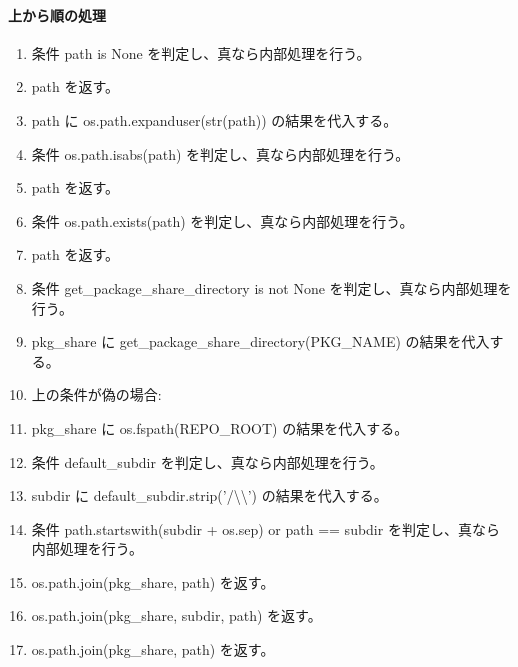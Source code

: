 \documentclass[a4paper,11pt]{article}
\begin{document}
            \paragraph{上から順の処理}
            \begin{enumerate}[leftmargin=1.8em]
            \item 条件 path is None を判定し、真なら内部処理を行う。
\item   path を返す。
\item path に os.path.expanduser(str(path)) の結果を代入する。
\item 条件 os.path.isabs(path) を判定し、真なら内部処理を行う。
\item   path を返す。
\item 条件 os.path.exists(path) を判定し、真なら内部処理を行う。
\item   path を返す。
\item 条件 get\_package\_share\_directory is not None を判定し、真なら内部処理を行う。
\item   pkg\_share に get\_package\_share\_directory(PKG\_NAME) の結果を代入する。
\item   上の条件が偽の場合:
\item   pkg\_share に os.fspath(REPO\_ROOT) の結果を代入する。
\item 条件 default\_subdir を判定し、真なら内部処理を行う。
\item   subdir に default\_subdir.strip('/\textbackslash{}\textbackslash{}') の結果を代入する。
\item   条件 path.startswith(subdir + os.sep) or path == subdir を判定し、真なら内部処理を行う。
\item     os.path.join(pkg\_share, path) を返す。
\item   os.path.join(pkg\_share, subdir, path) を返す。
\item os.path.join(pkg\_share, path) を返す。
            \end{enumerate}
\end{document}
